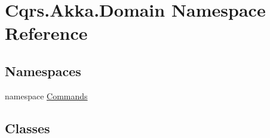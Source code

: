 \hypertarget{namespaceCqrs_1_1Akka_1_1Domain}{}\section{Cqrs.\+Akka.\+Domain Namespace Reference}
\label{namespaceCqrs_1_1Akka_1_1Domain}
\subsection*{Namespaces}
\begin{DoxyCompactItemize}
\item 
namespace \hyperlink{namespaceCqrs_1_1Akka_1_1Domain_1_1Commands}{Commands}
\end{DoxyCompactItemize}
\subsection*{Classes}
